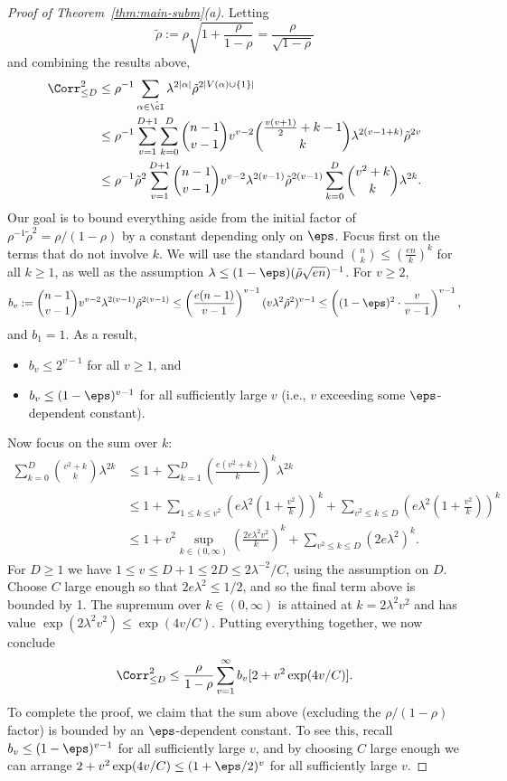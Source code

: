 \documentclass[11pt]{article}
\begin{document}
\begin{proof}[Proof of Theorem~\ref{thm:main-subm}(a)]
Letting
\[ \tilde\rho := \rho \sqrt{1+\frac{\rho}{1-\rho}} = \frac{\rho}{\sqrt{1-\rho}} \]
and combining the results above,
\begin{align*}
\Corr_{\le D}^2 &\le \rho^{-1} \sum_{\alpha \in \hat\cI} \lambda^{2|\alpha|} \tilde\rho^{2|V(\alpha) \cup \{1\}|} \\
&\le \rho^{-1} \sum_{v = 1}^{D+1} \sum_{k = 0}^D \binom{n-1}{v-1} v^{v-2} \binom{\frac{v(v+1)}{2} + k - 1}{k} \lambda^{2(v-1+k)} \tilde\rho^{2v} \\
&\le \rho^{-1} \tilde\rho^2 \sum_{v = 1}^{D+1} \binom{n-1}{v-1} v^{v-2} \lambda^{2(v-1)} \tilde\rho^{2(v-1)} \sum_{k = 0}^D \binom{v^2 + k}{k} \lambda^{2k}.
\end{align*}
Our goal is to bound everything aside from the initial factor of $\rho^{-1} \tilde\rho^2 = \rho/(1-\rho)$ by a constant depending only on $\eps$. Focus first on the terms that do not involve $k$. We will use the standard bound $\binom{n}{k} \le \left(\frac{en}{k}\right)^k$ for all $k \ge 1$, as well as the assumption $\lambda \le (1-\eps)(\tilde\rho\sqrt{en})^{-1}$. For $v \ge 2$,
\[ b_v := \binom{n-1}{v-1} v^{v-2} \lambda^{2(v-1)} \tilde\rho^{2(v-1)}
\le \left(\frac{e(n-1)}{v-1}\right)^{v-1} (v\lambda^2\tilde\rho^2)^{v-1} 
\le \left((1-\eps)^2 \cdot \frac{v}{v-1}\right)^{v-1}, \]
and $b_1 = 1$. As a result,
\begin{itemize}
\item $b_v \le 2^{v-1}$ for all $v \ge 1$, and
\item $b_v \le (1-\eps)^{v-1}$ for all sufficiently large $v$ (i.e., $v$ exceeding some $\eps$-dependent constant).
\end{itemize}
Now focus on the sum over $k$:
\begin{align*}
\sum_{k = 0}^D \binom{v^2 + k}{k} \lambda^{2k} &\le 1 + \sum_{k=1}^D \left(\frac{e(v^2+k)}{k}\right)^k \lambda^{2k} \\
&\le 1 + \sum_{1 \le k \le v^2} \left(e\lambda^2 \left(1 + \frac{v^2}{k}\right)\right)^k + \sum_{v^2 \le k \le D} \left(e\lambda^2 \left(1 + \frac{v^2}{k}\right)\right)^k \\
&\le 1 + v^2 \sup_{k \in (0,\infty)} \left(\frac{2e\lambda^2 v^2}{k}\right)^k + \sum_{v^2 \le k \le D} (2e\lambda^2)^k.
\end{align*}
For $D \ge 1$ we have $1 \le v \le D+1 \le 2D \le 2\lambda^{-2}/C$, using the assumption on $D$. Choose $C$ large enough so that $2e\lambda^2 \le 1/2$, and so the final term above is bounded by 1. The supremum over $k \in (0,\infty)$ is attained at $k = 2\lambda^2 v^2$ and has value $\exp(2\lambda^2 v^2) \le \exp(4v/C)$. Putting everything together, we now conclude
\[ \Corr_{\le D}^2 \le \frac{\rho}{1-\rho} \sum_{v=1}^\infty b_v [2 + v^2 \exp(4v/C)]. \]
To complete the proof, we claim that the sum above (excluding the $\rho/(1-\rho)$ factor) is bounded by an $\eps$-dependent constant. To see this, recall $b_v \le (1-\eps)^{v-1}$ for all sufficiently large $v$, and by choosing $C$ large enough we can arrange $2+v^2 \exp(4v/C) \le (1+\eps/2)^v$ for all sufficiently large $v$.
\end{proof}
\end{document}
